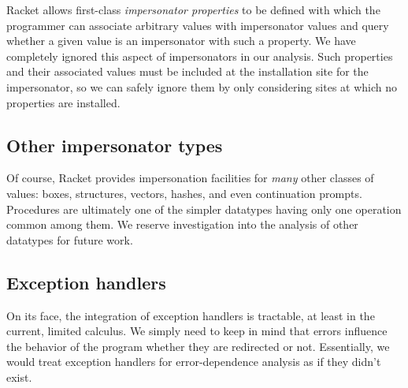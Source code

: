 Racket allows first-class \emph{impersonator properties} to be defined with which the programmer can associate arbitrary values with impersonator values and query whether a given value is an impersonator with such a property.
We have completely ignored this aspect of impersonators in our analysis.
Such properties and their associated values must be included at the installation site for the impersonator, so we can safely ignore them by only considering sites at which no properties are installed.

\subsection{Other impersonator types}

Of course, Racket provides impersonation facilities for \emph{many} other classes of values: boxes, structures, vectors, hashes, and even continuation prompts.
Procedures are ultimately one of the simpler datatypes having only one operation common among them.
We reserve investigation into the analysis of other datatypes for future work.


\subsection{Exception handlers}

On its face, the integration of exception handlers is tractable, at least in the current, limited calculus.
We simply need to keep in mind that errors influence the behavior of the program whether they are redirected or not.
Essentially, we would treat exception handlers for error-dependence analysis as if they didn't exist.






